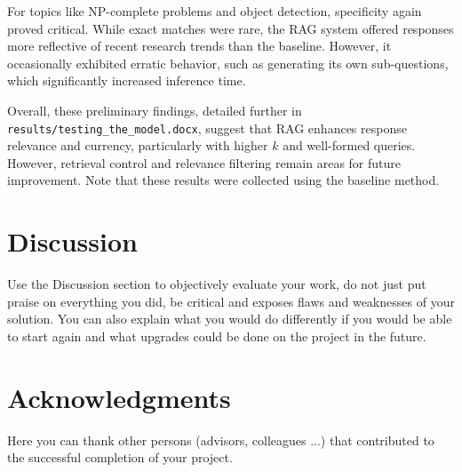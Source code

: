 \documentclass[fleqn,moreauthors,10pt]{ds_report}
\begin{document}
For topics like NP-complete problems and object detection, specificity again proved critical. While exact matches were rare, the RAG system offered responses more reflective of recent research trends than the baseline. However, it occasionally exhibited erratic behavior, such as generating its own sub-questions, which significantly increased inference time.

Overall, these preliminary findings, detailed further in \texttt{results/testing\_the\_model.docx},
 suggest that RAG enhances response relevance and currency, particularly with higher $k$
  and well-formed queries. However, retrieval control and relevance filtering remain
  areas for future improvement. Note that these results were collected using the baseline method. 
  






\section*{Discussion}

Use the Discussion section to objectively evaluate your work, do not just put praise on everything you did, be critical and exposes flaws and weaknesses of your solution. You can also explain what you would do differently if you would be able to start again and what upgrades could be done on the project in the future.



\section*{Acknowledgments}

Here you can thank other persons (advisors, colleagues ...) that contributed to the successful completion of your project.




\end{document}
